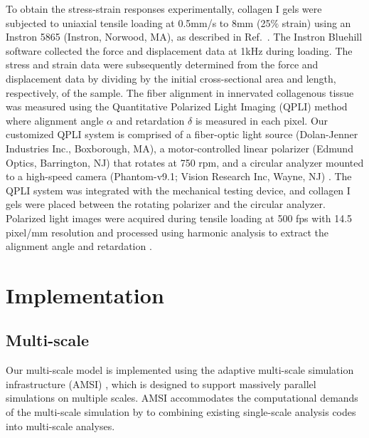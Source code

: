\documentclass[]{interact}
\begin{document}
To obtain the stress-strain responses experimentally, collagen I gels were subjected to uniaxial tensile loading at 0.5mm/s to 8mm (25$\%$ strain) using an Instron 5865 (Instron, Norwood, MA), as described in Ref.\ . The Instron Bluehill software collected the force and displacement data at 1kHz during loading. The stress and strain data were subsequently determined from the force and displacement data by dividing by the initial cross-sectional area and length, respectively, of the sample. The fiber alignment in innervated collagenous tissue was measured using the Quantitative Polarized Light Imaging (QPLI) method \citep{Quinn:2008df,Quinn:2009bf} where alignment angle $\alpha$ and retardation $\delta$ is measured in each pixel. Our customized QPLI system \citep{Zhang:2016ga} is comprised of a fiber-optic light source (Dolan-Jenner Industries Inc., Boxborough, MA), a motor-controlled linear polarizer (Edmund Optics, Barrington, NJ) that rotates at 750 rpm, and a circular analyzer mounted to a high-speed camera (Phantom-v9.1; Vision Research Inc, Wayne, NJ) \citep{Zhang:2016ga}. The QPLI system was integrated with the mechanical testing device, and collagen I gels were placed between the rotating polarizer and the circular analyzer. Polarized light images were acquired during tensile loading at 500 fps with 14.5 pixel/mm resolution and processed using harmonic analysis to extract the alignment angle and retardation \citep{Tower:2002hk,Quinn:2008df}.

\section{Implementation}
\label{sec:implementation}

\subsection{Multi-scale}
Our multi-scale model is implemented using the adaptive multi-scale simulation infrastructure (AMSI) \citep{Tobin:2017ip}, which is designed to support massively parallel simulations on multiple scales. AMSI accommodates the computational demands of the multi-scale simulation by to combining existing single-scale analysis codes into multi-scale analyses.
\end{document}
